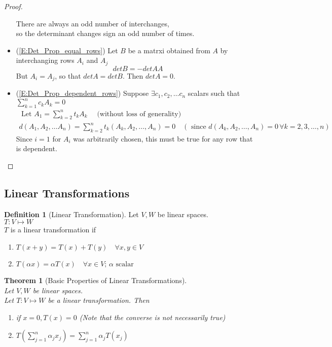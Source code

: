 \documentclass[twoside]{amsart}
\theoremstyle{plain}
\newtheorem{theorem}{Theorem}
\theoremstyle{definition}
\newtheorem{definition}{Definition}
\begin{document}
\begin{proof}
\begin{itemize}
    There are always an odd number of interchanges, \\
    \phantom{There} so the determinant changes sign an odd number of times.  
  \item (\ref{E:Det_Prop_equal_rows}) Let $B$ be a matrxi obtained from $A$ by interchanging rows $A_i$ and $A_j$ \\
    \[
    det B = - det AA
    \]
    But $A_i=A_j$, so that $det A = det B$.  Then $det A = 0$.   
  \item (\ref{E:Det_Prop_dependent_rows}) Suppose $\exists c_1 , c_2, \dots c_n$ scalars such that $\sum_{k=1}^n c_k A_k = 0 $ \\ 
\begin{gather*}
\text{ Let } A_1 = \sum_{k=2}^n t_k A_k \quad \text{ (without loss of generality) } \\
d(A_1,A_2,\dots A_n ) = \sum_{k=2}^n t_k (A_k, A_2, \dots , A_n) = 0 \quad ( \text{ since } d(A_k,A_2,\dots , A_n) =0  \, \forall k = 2, 3, \dots ,n) 
\end{gather*}
Since $i=1$ for $A_i$ was arbitrarily chosen, this must be true for any row that is dependent.  
  \end{itemize}
\end{proof}

\subsection{Linear Transformations}

\begin{definition}[Linear Transformation]
Let $V,W$ be linear spaces.  \\
$T:V \mapsto W$ \\
$T$ is a linear transformation if
\begin{enumerate}
\item $T(x+y) = T(x)+T(y) \quad \forall x,y \in V$ 
  \item $T(\alpha x) = \alpha T(x) \quad \forall x \in V; \, \alpha \text{ scalar }$ 
\end{enumerate}
\end{definition}

\begin{theorem}[Basic Properties of Linear Transformations]\label{T:Properties_of_Linear_Transformations} \quad \\
Let $V,W$ be linear spaces.  \\
Let $T:V \mapsto W $ be a linear transformation.  Then 
\begin{enumerate}
\item if $x=0, T(x) = 0 $ (Note that the converse is not necessarily true) 
\item $T(\sum_{j=1}^{n} \alpha_j x_j ) = \sum_{j=1}^n \alpha_j T(x_j)$ 
\end{enumerate}
\end{theorem}
\end{document}
